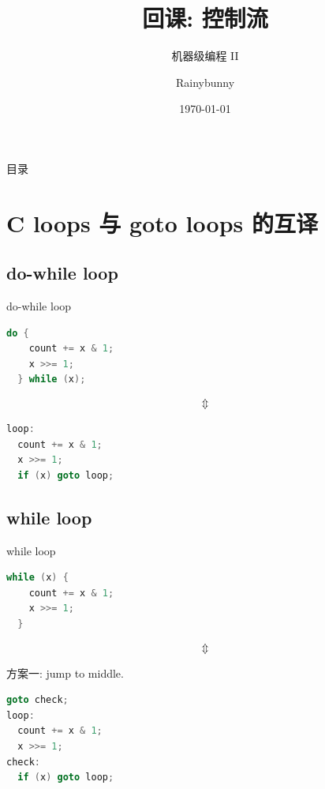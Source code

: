 \documentclass{ctexbeamer}
\begin{document}
\title{回课: 控制流}
\subtitle{机器级编程 II}
\author{Rainybunny}
\date{\today}
\frame{\titlepage}

\begin{frame}{目录}
    \tableofcontents[hideallsubsections]
\end{frame}


\section{C loops 与 goto loops 的互译}

\subsection*{do-while loop}

\begin{frame}[fragile]{do-while loop}
  \begin{lstlisting}[language=C]
  do {
    count += x & 1;
    x >>= 1;
  } while (x);
  \end{lstlisting}

  $$
    \Updownarrow
  $$

  \begin{lstlisting}[language=C]
loop:
  count += x & 1;
  x >>= 1;
  if (x) goto loop;
  \end{lstlisting}
\end{frame}

\subsection*{while loop}

\begin{frame}[fragile]{while loop}
  \begin{lstlisting}[language=C]
  while (x) {
    count += x & 1;
    x >>= 1;
  }
  \end{lstlisting}

  $$
    \Updownarrow
  $$

  \qquad 方案一: jump to middle.
  \begin{lstlisting}[language=C]
  goto check;
loop:
  count += x & 1;
  x >>= 1;
check:
  if (x) goto loop;
  \end{lstlisting}
\end{frame}
\end{document}
